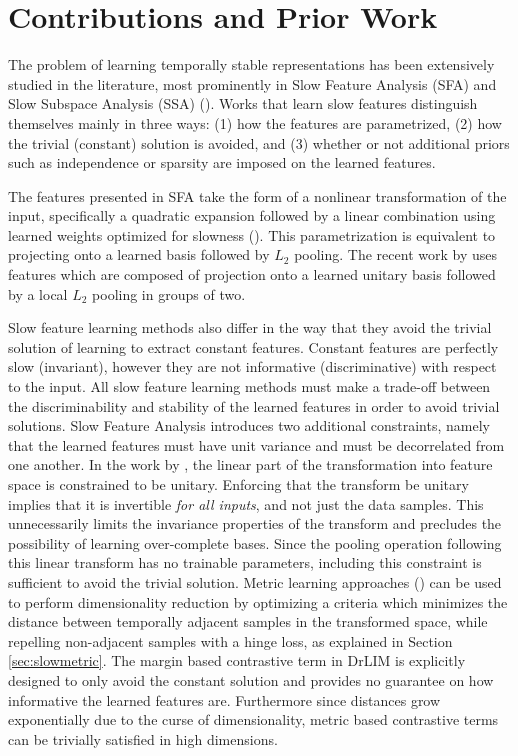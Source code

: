 \section{Contributions and Prior Work} The problem of learning temporally
stable representations has been extensively studied in the literature, most
prominently in Slow Feature Analysis (SFA) and Slow Subspace Analysis (SSA)
(\cite{SFA,SSA,hyvarinen2003bubbles}). Works that learn slow features
distinguish themselves mainly in three ways: (1) how the features are
parametrized, (2) how the trivial (constant) solution is avoided, and (3)
whether or not additional priors such as independence or sparsity are imposed
on the learned features. 

The features presented in SFA take the form of a nonlinear transformation of
the input, specifically a quadratic expansion followed by a linear combination
using learned weights optimized for slowness (\cite{SFA}).  This
parametrization is equivalent to projecting onto a learned basis followed by
$L_2$ pooling. The recent work by \cite{complexCells} uses features which are
composed of projection onto a learned unitary basis followed by a local $L_2$
pooling in groups of two. 

Slow feature learning methods also differ in the way that they avoid the
trivial solution of learning to extract constant features. Constant features
are perfectly slow (invariant), however they are not informative
(discriminative) with respect to the input. All slow feature learning methods
must make a trade-off between the discriminability and stability of the learned
features in order to avoid trivial solutions. Slow Feature Analysis introduces
two additional constraints, namely that the learned features must have unit
variance and must be decorrelated from one another. In the work by
\cite{complexCells}, the linear part of the transformation into feature space
is constrained to be unitary. Enforcing that the transform be unitary implies
that it is invertible \emph{for all inputs}, and not just the data samples.
This unnecessarily limits the invariance properties of the transform and
precludes the possibility of learning over-complete bases. Since the pooling
operation following this linear transform has no trainable parameters,
including this constraint is sufficient to avoid the trivial solution. Metric
learning approaches (\cite{DrLIM}) can be used to perform dimensionality
reduction by optimizing a criteria which minimizes the distance between
temporally adjacent samples in the transformed space, while repelling
non-adjacent samples with a hinge loss, as explained in Section
\ref{sec:slowmetric}. The margin based contrastive term in DrLIM is explicitly
designed to only avoid the constant solution and provides no guarantee on how
informative the learned features are. Furthermore since distances grow
exponentially due to the curse of dimensionality, metric based contrastive
terms can be trivially satisfied in high dimensions.


